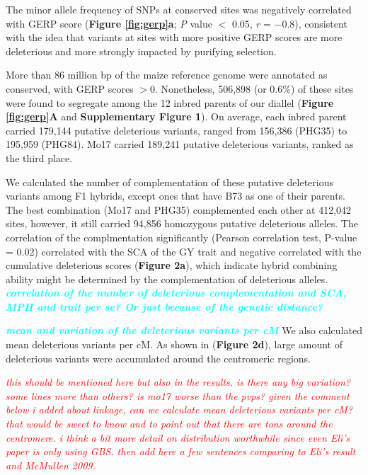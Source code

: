 \documentclass[twoside,twocolumn, letterpaper]{article}
\newcommand{\yang}[1]{\textcolor{cyan}{\emph{\bf  #1}}}
\newcommand{\jri}[1]{\textcolor{red}{ \emph{ #1}} }
\begin{document}
The minor allele frequency of SNPs at conserved sites was negatively correlated with GERP score (\textbf{Figure \ref{fig:gerp}a}; \emph{P} value $<$ 0.05, \emph{r} = $-0.8$), consistent with the idea that variants at sites with more positive GERP scores are more deleterious and more strongly impacted by purifying selection.

More than 86 million bp of the maize reference genome were annotated as conserved\citep{rodgers2015recombination}, with GERP scores $>0$. Nonetheless, 506,898 (or 0.6\%) of these sites were found to segregate among the 12 inbred parents of our diallel (\textbf{Figure \ref{fig:gerp}A} and \textbf{Supplementary Figure 1}).
On average, each inbred parent carried 179,144 putative deleterious variants, ranged from 156,386 (PHG35) to 195,959 (PHG84). Mo17 carried 189,241 putative deleterious variants, ranked as the third place. 

We calculated the number of complementation of these putative deleterious variants among F1 hybrids, except ones that have B73 as one of their parents. The best combination (Mo17 and PHG35) complemented each other at 412,042 sites, however, it still carried 94,856 homozygous putative deleterious alleles. The correlation of the complmentation significantly (Pearson correlation test, P-value = 0.02) correlated with the SCA of the GY trait and negative correlated with the cumulative deleterious scores (\textbf{Figure 2a}), which indicate hybrid combining ability might be determined by the complementation of deleterious alleles. \yang{correlation of the number of deleterious complementation and SCA, MPH and trait per se? Or just because of the genetic distance?}    

\yang{mean and variation of the deleterious variants per cM}
We also calculated mean deleterious variants per cM. As shown in (\textbf{Figure 2d}), large amount of deleterious variants were accumulated around the centromeric regions. 

\jri{this should be mentioned here but also in the results. is there any big variation?  some lines more than others? is mo17 worse than the pvps? given the comment below i added about linkage, can we calculate mean deleterious variants per cM?  that would be sweet to know and to point out that there are tons around the centromere. i think a bit more detail on distribution worthwhile since even Eli's paper is only using GBS. then add here a few sentences comparing to Eli's result and McMullen 2009.}
\end{document}

